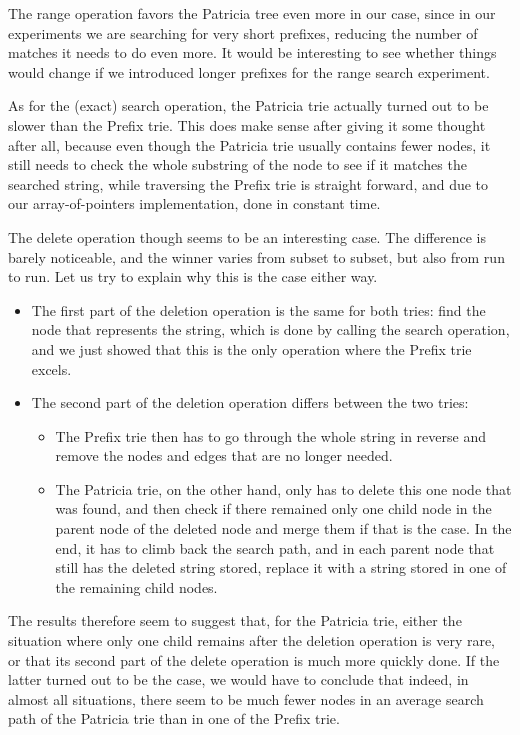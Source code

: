 \documentclass[essay]{fer}
\begin{document}
The range operation favors the Patricia tree even more in our case, since in our experiments we are searching for very short prefixes, reducing the number of matches it needs to do even more. It would be interesting to see whether things would change if we introduced longer prefixes for the range search experiment.

As for the (exact) search operation, the Patricia trie actually turned out to be slower than the Prefix trie.
This does make sense after giving it some thought after all, because even though the Patricia trie usually contains fewer nodes,
it still needs to check the whole substring of the node to see if it matches the searched string, while traversing the Prefix trie is straight forward, and due to our array-of-pointers implementation, done in constant time.

The delete operation though seems to be an interesting case.
The difference is barely noticeable, and the winner varies from subset to subset, but also from run to run.
Let us try to explain why this is the case either way.
\begin{itemize}
  \item The first part of the deletion operation is the same for both tries: find the node that represents the string, which is done by calling the search operation,
        and we just showed that this is the only operation where the Prefix trie excels.
  \item The second part of the deletion operation differs between the two tries:
        \begin{itemize}
          \item The Prefix trie then has to go through the whole string in reverse and remove the nodes and edges that are no longer needed.
          \item The Patricia trie, on the other hand, only has to delete this one node that was found,
                and then check if there remained only one child node in the parent node of the deleted node and merge them if that is the case.
                In the end, it has to climb back the search path, and in each parent node that still has the deleted string stored, replace it with a string stored in one of the remaining child nodes.
        \end{itemize}
\end{itemize}
The results therefore seem to suggest that, for the Patricia trie, either the situation where only one child remains after the deletion operation is very rare,
or that its second part of the delete operation is much more quickly done.
If the latter turned out to be the case, we would have to conclude that indeed, in almost all situations,
there seem to be much fewer nodes in an average search path of the Patricia trie than in one of the Prefix trie.
\end{document}
